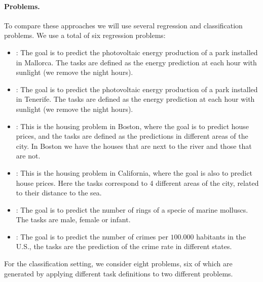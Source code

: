 \paragraph*{Problems.}
To compare these approaches we will use several regression and classification problems. We use a total of six regression problems:
\begin{itemize}
    \item {}: The goal is to predict the photovoltaic energy production of a park installed in Mallorca. The tasks are defined as the energy prediction at each hour with sunlight (we remove the night hours).
    \item {}: The goal is to predict the photovoltaic energy production of a park installed in Tenerife. The tasks are defined as the energy prediction at each hour with sunlight (we remove the night hours).
    \item {}: This is the housing problem in Boston, where the goal is to predict house prices, and the tasks are defined as the predictions in different areas of the city. In Boston we have the houses that are next to the river and those that are not.
    \item {}: This is the housing problem in California, where the goal is also to predict house prices. Here the tasks correspond to 4 different areas of the city, related to their distance to the sea.
    \item {}: The goal is to predict the number of rings of a specie of marine molluscs. The tasks are male, female or infant.
    \item {}: The goal is to predict the number of crimes per $100.000$ habitants in the U.S., the tasks are the prediction of the crime rate in different states.
\end{itemize}
For the classification setting, we consider eight problems, six of which are generated by applying different task definitions to two different problems.
